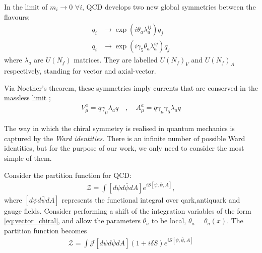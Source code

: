 In the limit of $m_i\to 0\,\,\forall i$, QCD develops two new global symmetries between the flavours;
\begin{align}
  \label{eq:vector_chiral}
  q_i &\to \exp(i\theta_a \lambda^{ij}_a) q_j \\
  q_i &\to \exp(i\gamma_5 \theta_a \lambda^{ij}_a) q_j
\end{align}
where $\lambda_a$ are $U(N_f)$ matrices. They are labelled $U(N_f)_V$ and $U(N_f)_A$ respectively, standing for vector and axial-vector.

Via Noether's theorem, these symmetries imply currents that are conserved in the massless limit \cite{Scherer:2002tk};
\begin{align}
  \label{eq:chiralcurrents}
  V_{\mu}^a = \bar{q} \gamma_{\mu} \lambda_a q \quad,\quad
  A_{\mu}^a = \bar{q} \gamma_{\mu} \gamma_5 \lambda_a q
\end{align}

The way in which the chiral symmetry is realised in quantum mechanics is captured by the {\it{Ward identities}}. There is an infinite number of possible Ward identities, but for the purpose of our work, we only need to consider the most simple of them. %

Consider the partition function for QCD:
\begin{align}
  \mathcal{Z} = \int [d\psi d\bar{\psi} dA] e^{iS[\psi,\bar{\psi},A]},
\end{align}
where $[d\psi d\bar{\psi} dA]$ represents the functional integral over qark,antiquark and gauge fields. Consider performing a shift of the integration variables of the form \eqref{eq:vector_chiral}, and allow the parameters $\theta_a$ to be local, $\theta_a=\theta_a(x)$. The partition function becomes
\begin{align}
  \mathcal{Z} = \int \mathcal{J} [d\psi d\bar{\psi} dA] ( 1 + i\delta S ) e^{iS[\psi,\bar{\psi},A]}
  \label{eq:partition_transformed}
\end{align}

